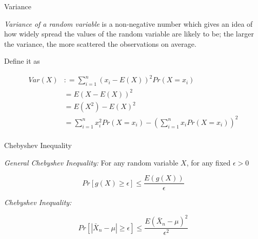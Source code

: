 \documentclass{beamer}\usepackage[]{graphicx}\usepackage[]{color}
\begin{document}
\begin{frame}[fragile]{Variance \;\;}

\emph{Variance of a random variable} is a non-negative number which gives an idea of how widely spread the values of the random variable are likely to be; the larger the variance, the more scattered the observations on average. \pause \newline

Define it as

\begin{align}
Var(X) & : = \sum_{i=1}^{n} (x_{i} - E(X))^2 Pr(X=x_{i})  \\
          & = E(X - E(X))^2 \\
          & = E(X^2) - E(X)^2 \\
          & = \sum_{i=1}^{n} x^2_{i} Pr(X=x_{i}) - \left (\sum_{i=1}^{n} x_{i} Pr (X= x_{i}) \right)^2 \\
\end{align}

\end{frame}

\begin{frame}[fragile]{Chebyshev Inequality \;\;}

\emph{General Chebyshev Inequality:}  For any random variable $X$, for any fixed $\epsilon>0$

$$ Pr [ g(X) \geq \epsilon ] \leq \frac { E (g(X)) }{\epsilon} $$

\emph{Chebyshev Inequality:}

$$ Pr [ \left | \bar{X}_{n} - \mu \right | \geq \epsilon ] \leq \frac{E(\bar{X}_{n} - \mu)^2}{\epsilon^2}  $$

\end{frame}
\end{document}
